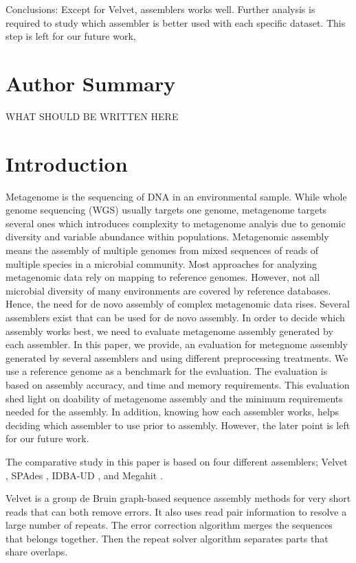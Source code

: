  
Conclusions: Except for Velvet, assemblers works well. Further analysis is required to study which assembler is better used with each specific dataset. This step is left for our future work, 
\section*{Author Summary}

WHAT SHOULD BE WRITTEN HERE


\section*{Introduction}

 
Metagenome is the sequencing of DNA in an environmental sample. While whole genome sequencing (WGS) usually targets one genome, metagenome targets several ones which introduces complexity to metagenome analyis due to genomic diversity and variable abundance within populations.  Metagenomic assembly  means the assembly of multiple genomes from mixed sequences of reads of multiple species in a microbial community.  
Most approaches for analyzing metagenomic data rely on mapping to reference genomes. However, not all microbial diversity of many environments are covered by reference databases. Hence, the need for de novo assembly of complex metagenomic data rises.  
Several assemblers exist that can be used for de novo assembly. In order to decide which assembly works best, we need to evaluate metagenome assembly generated by each assembler.  In this paper, we provide, an evaluation for metegnome assembly generated by several assemblers and using different preprocessing treatments. We use a reference genome as a benchmark for the evaluation.  The evaluation is based on assembly accuracy, and time and memory requirements. This evaluation shed light on doability of metagenome assembly and the minimum requirements needed for the assembly. In addition, knowing how each assembler works, helps deciding which assembler to use prior to assembly. However, the later point is left for our future work. 
 
The comparative study in this paper is based on four different assemblers; Velvet \cite{velvet}, SPAdes \cite {spades}, IDBA-UD \cite{idba}, and Megahit \cite{megahit}.  


Velvet \cite{velvet} is a group de Bruin graph-based sequence assembly methods for very short reads that can both remove errors. It also uses read pair information to resolve a large number of repeats.  The error correction algorithm merges the sequences that belongs together. Then the repeat solver algorithm separates parts that share overlaps. 


